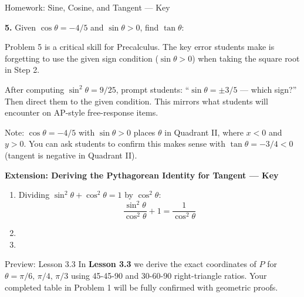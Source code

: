 \documentclass[10pt]{article}
\begin{document}
\begin{notesbox}{Homework: Sine, Cosine, and Tangent --- Key}
\vspace{0.12in}

\textbf{5.} Given $\cos\theta = -4/5$ and $\sin\theta > 0$, find $\tan\theta$:


\begin{teachernote}
Problem 5 is a critical skill for Precalculus. The key error students make is forgetting to
use the given sign condition ($\sin\theta > 0$) when taking the square root in Step 2.

After computing $\sin^2\theta = 9/25$, prompt students: ``$\sin\theta = \pm 3/5$ --- which sign?''
Then direct them to the given condition. This mirrors what students will encounter on AP-style
free-response items.

Note: $\cos\theta = -4/5$ with $\sin\theta > 0$ places $\theta$ in Quadrant II, where $x < 0$ and
$y > 0$. You can ask students to confirm this makes sense with $\tan\theta = -3/4 < 0$ (tangent is
negative in Quadrant II).
\end{teachernote}

\end{notesbox}

\begin{extensionbox}
\textbf{Extension: Deriving the Pythagorean Identity for Tangent --- Key}

\begin{enumerate}[leftmargin=1.8em, itemsep=4pt]
  \item Dividing $\sin^2\theta + \cos^2\theta = 1$ by $\cos^2\theta$:
        \[
          \frac{\sin^2\theta}{\cos^2\theta} + 1 = \frac{1}{\cos^2\theta}
        \]
  \item {}
  \item {}
\end{enumerate}
\end{extensionbox}

\vspace{0.10in}

\begin{notesbox}{Preview: Lesson 3.3}
In \textbf{Lesson 3.3} we derive the exact coordinates of $P$ for
$\theta = \pi/6,\, \pi/4,\, \pi/3$ using 45-45-90 and 30-60-90 right-triangle ratios.
Your completed table in Problem 1 will be fully confirmed with geometric proofs.
\end{notesbox}
\end{document}
